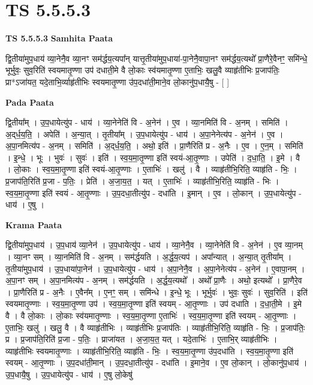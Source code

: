 \documentclass[17pt]{extarticle}
\begin{document}
\section{ TS 5.5.5.3 }

\textbf{TS 5.5.5.3 } \newline
\textbf{Samhita Paata} \newline

द्वि॒तीया॑मुप॒धाय॑ व्या॒नेनै॒व व्या॒नꣳ सम॑र्द्धय॒त्यपा᳚न् यात्तृ॒तीया॑मुप॒धाया॑-पा॒नेनै॒वापा॒नꣳ सम॑र्द्धय॒त्यथो᳚ प्रा॒णैरे॒वैनꣳ॒॒ समि॑न्धे॒ भूर्भुवः॒ सुव॒रिति॑ स्वयमातृ॒ण्णा उप॑ दधाती॒मे वै लो॒काः स्व॑यमातृ॒ण्णा ए॒ताभिः॒ खलु॒वै व्याहृ॑तीभिः प्र॒जाप॑तिः॒ प्रा*ऽजा॑यत॒ यदे॒ताभि॒र्व्याहृ॑तीभिः स्वयमातृ॒ण्णा उ॑प॒दधा॑ती॒माने॒व लो॒कानु॑प॒धायै॒षु - [  ] \newline

\textbf{Pada Paata} \newline

द्वि॒तीया᳚म् । उ॒प॒धायेत्यु॑प - धाय॑ । व्या॒नेनेति॑ वि - अ॒नेन॑ । ए॒व । व्या॒नमिति॑ वि - अ॒नम् । समिति॑ । अ॒द्‌र्ध॒य॒ति॒ । अपेति॑ । अ॒न्या॒त् । तृ॒तीया᳚म् । उ॒प॒धायेत्यु॑प - धाय॑ । अ॒पा॒नेनेत्य॑प - अ॒नेन॑ । ए॒व । अ॒पा॒नमित्य॑प - अ॒नम् । समिति॑ । अ॒द्‌र्ध॒य॒ति॒ । अथो॒ इति॑ । प्रा॒णैरिति॑ प्र - अ॒नैः । ए॒व । ए॒न॒म् । समिति॑ । इ॒न्धे॒ । भूः । भुवः॑ । सुवः॑ । इति॑ । स्व॒य॒मा॒तृ॒ण्णा इति॑ स्वयं-आ॒तृ॒ण्णाः । उपेति॑ । द॒धा॒ति॒ । इ॒मे । वै । लो॒काः । स्व॒य॒मा॒तृ॒ण्णा इति॑ स्वयं-आ॒तृ॒ण्णाः । ए॒ताभिः॑ । खलु॑ । वै । व्याहृ॑तीभि॒रिति॒ व्याहृ॑ति - भिः॒ । प्र॒जाप॑ति॒रिति॑ प्र॒जा - प॒तिः॒ । प्रेति॑ । अ॒जा॒य॒त॒ । यत् । ए॒ताभिः॑ । व्याहृ॑तीभि॒रिति॒ व्याहृ॑ति - भिः । स्व॒य॒मा॒तृ॒ण्णा इति॑ स्वयं - आ॒तृ॒ण्णाः । उ॒प॒दधा॒तीत्यु॑प - दधा॑ति । इ॒मान् । ए॒व । लो॒कान् । उ॒प॒धायेत्यु॑प - धाय॑ । ए॒षु ।  \newline


\textbf{Krama Paata} \newline

द्वि॒तीया॑मुप॒धाय॑ । उ॒प॒धाय॑ व्या॒नेन॑ । उ॒प॒धायेत्यु॑प - धाय॑ । व्या॒नेनै॒व । व्या॒नेनेति॑ वि - अ॒नेन॑ । ए॒व व्या॒नम् । व्या॒नꣳ सम् । व्या॒नमिति॑ वि - अ॒नम् । सम॑र्द्धयति । अ॒र्द्ध॒य॒त्यप॑ । अपा᳚न्यात् । अ॒न्या॒त् तृ॒तीया᳚म् । तृ॒तीया॑मुप॒धाय॑ । उ॒प॒धाया॑पा॒नेन॑ । उ॒प॒धायेत्यु॑प - धाय॑ । अ॒पा॒नेनै॒व । अ॒पा॒नेनेत्य॑प - अ॒नेन॑ । ए॒वापा॒नम् । अ॒पा॒नꣳ सम् । अ॒पा॒नमित्य॑प - अ॒नम् । सम॑र्द्धयति । अ॒र्द्ध॒य॒त्यथो᳚ । अथो᳚ प्रा॒णैः । अथो॒ इत्यथो᳚ । प्रा॒णैरे॒व । प्रा॒णैरिति॑ प्र - अ॒नैः । ए॒वैन᳚म् । ए॒नꣳ॒॒ सम् । समि॑न्धे । इ॒न्धे॒ भूः । भूर्भुवः॑ । भुवः॒ सुवः॑ । सुव॒रिति॑ । इति॑ स्वयमातृ॒ण्णाः । स्व॒य॒मा॒तृ॒ण्णा उप॑ । स्व॒य॒मा॒तृ॒ण्णा इति॑ स्वयम् - आ॒तृ॒ण्णाः । उप॑ दधाति । द॒धा॒ती॒मे । इ॒मे वै । वै लो॒काः । लो॒काः स्व॑यमातृ॒ण्णाः । स्व॒य॒मा॒तृ॒ण्णा ए॒ताभिः॑ । स्व॒य॒मा॒तृ॒ण्णा इति॑ स्वयम् - आ॒तृ॒ण्णाः । ए॒ताभिः॒ खलु॑ । खलु॒ वै । वै व्याहृ॑तीभिः । व्याहृ॑तीभिः प्र॒जाप॑तिः । व्याहृ॑तीभि॒रिति॒ व्याहृ॑ति - भिः॒ । प्र॒जाप॑तिः॒ प्र । प्र॒जाप॑ति॒रिति॑ प्र॒जा - प॒तिः॒ । प्राजा॑यत । अ॒जा॒य॒त॒ यत् । यदे॒ताभिः॑ । ए॒ताभि॒र् व्याहृ॑तीभिः । व्याहृ॑तीभिः स्वयमातृ॒ण्णाः । व्याहृ॑तीभि॒रिति॒ व्याहृ॑ति - भिः॒ । स्व॒य॒मा॒तृ॒ण्णा उ॑प॒दधा॑ति । स्व॒य॒मा॒तृ॒ण्णा इति॑ स्वयम् - आ॒तृ॒ण्णाः । उ॒प॒दधा॑ती॒मान् । उ॒प॒दधा॒तीत्यु॑प - दधा॑ति । इ॒माने॒व । ए॒व लो॒कान् । लो॒कानु॑प॒धाय॑ । उ॒प॒धायै॒षु । उ॒प॒धायेत्यु॑प - धाय॑ । ए॒षु लो॒केषु॑ \newline
\end{document}
